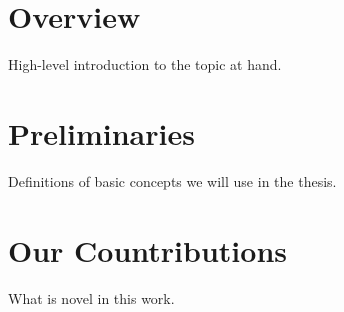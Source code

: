 \section{Overview}

High-level introduction to the topic at hand.

\section{Preliminaries}

Definitions of basic concepts we will use in the thesis. 


\section{Our Countributions}

What is novel in this work.

